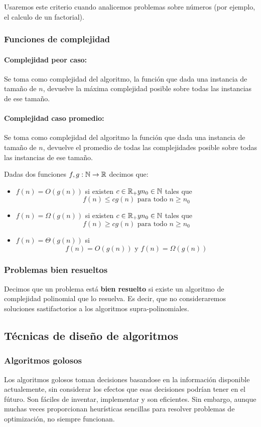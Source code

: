 Usaremos este criterio cuando analicemos problemas sobre números (por ejemplo, el calculo de un factorial).

\subsubsection{Funciones de complejidad}
\paragraph{Complejidad peor caso:} Se toma como complejidad del algoritmo, la función que dada una instancia de tamaño de $n$, devuelve la máxima complejidad posible sobre todas las instancias de ese tamaño.

\paragraph{Complejidad caso promedio:} Se toma como complejidad del algoritmo la función que dada una instancia de tamaño de $n$, devuelve el promedio de todas las complejidades posible sobre todas las instancias de ese tamaño.

\vspace*{5mm}
Dadas dos funciones \(f,g:\mathbb{N}\to\mathbb{R}\) decimos que:
\begin{itemize}
	\item \(f(n) = O(g(n))\) si existen \(c\in\mathbb{R}_+ y n_0\in\mathbb{N}\) tales que
	\[f(n)\leq cg(n) \text{ para todo } n\geq n_0\]
	\item \(f(n) = \Omega(g(n))\) si existen \(c\in\mathbb{R}_+ y n_0\in\mathbb{N}\) tales que
	\[f(n)\geq cg(n) \text{ para todo } n\geq n_0\]
	\item \(f(n) = \Theta(g(n))\) si \[f(n) = O(g(n)) \text{ y } f(n)= \Omega(g(n))\]
\end{itemize}

\subsubsection{Problemas bien resueltos}
Decimos que un problema está \textbf{bien resuelto} si existe un algoritmo de complejidad polinomial que lo resuelva. Es decir, que no consideraremos soluciones sastifactorios a los algoritmos supra-polinomiales.

\subsection{Técnicas de diseño de algoritmos}
\subsubsection{Algoritmos golosos}
Los algoritmos golosos toman decisiones basandose en la información disponible actualemente, sin considerar los efectos que esas decisiones podrían tener en el fúturo. Son fáciles de inventar, implementar y son eficientes. Sin embargo, aunque muchas veces proporcionan heurísticas sencillas para resolver problemas de optimización, no siempre funcionan.


